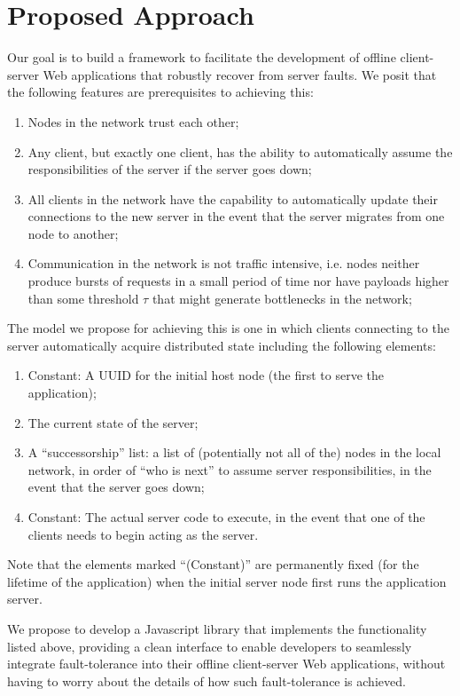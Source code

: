 \section{Proposed Approach}
\label{sec:approach}

Our goal is to build a framework to facilitate the development of offline client-server Web applications that robustly recover from server faults. 
We posit that the following features are prerequisites to achieving this:

\begin{enumerate}
    \item Nodes in the network trust each other;
    \item Any client, but exactly one client, has the ability to automatically assume the responsibilities of the server if the server goes down;
    \item All clients in the network have the capability to automatically update their connections to the new server in the event that the server migrates from one node to another;
    \item Communication in the network is not traffic intensive, i.e. nodes neither produce bursts of requests in a small period of time nor have payloads higher than some threshold $\tau$ that might generate bottlenecks in the network;
    
\end{enumerate}

The model we propose for achieving this is one in which clients connecting to the server automatically acquire distributed state including the following elements:

\begin{enumerate}
	\item Constant: A UUID for the initial host node (the first to serve the application);
    \item The current state of the server;
	\item A ``successorship'' list: a list of (potentially not all of the) nodes in the local network, in order of ``who is next'' to assume server responsibilities, in the event that the server goes down;
    \item Constant: The actual server code to execute, in the event that one of the clients needs to begin acting as the server.
\end{enumerate}

Note that the elements marked ``(Constant)'' are permanently fixed (for the lifetime of the application) when the initial server node first runs the application server.

We propose to develop a Javascript library that implements the functionality listed above, providing a clean interface to enable developers to seamlessly integrate fault-tolerance into their offline client-server Web applications, without having to worry about the details of how such fault-tolerance is achieved.




